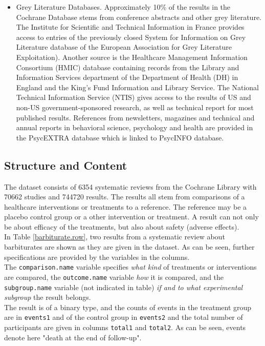 \documentclass[11pt,a4paper,twoside]{book}\usepackage[]{graphicx}\usepackage[]{color}
\begin{document}
\begin{itemize}
\item Grey Literature Databases. Approximately 10\% of the results in the Cochrane Database stems from conference abstracts and other grey literature. The Institute for Scientific and Technical Information in France provides access to entries of the previously closed System for Information on Grey Literature database of the European Association for Grey Literature Exploitation). Another source is the Healthcare Management Information Consortium (HMIC) database containing records from the Library and Information Services department of the Department of Health (DH) in England and the King's Fund Information and Library Service. The National Technical Information Service (NTIS) gives access to the results of US and non-US government-sponsored research, as well as technical report for most published results. References from newsletters, magazines and technical and annual reports in behavioral science, psychology and health are provided in the PsycEXTRA database which is linked to PsycINFO database.
\end{itemize}


\subsection{Structure and Content}
The dataset consists of 6354 systematic reviews from the Cochrane Library with 70662 studies and 744720 results. The results all stem from comparisons of a healthcare interventions or treatments to a reference. The reference may be a placebo control group or a other intervention or treatment. A result can not only be about efficacy of the treatments, but also about safety (adverse effects).\\
In Table \ref{barbiturate.row}, two results from a systematic review about barbiturates are shown as they are given in the dataset. As can be seen, further specifications are provided by the variables in the columns. \\
The \texttt{comparison.name} variable specifies \textit{what kind} of treatments or interventions are compared, the \texttt{outcome.name} variable \textit{how} it is compared, and the \texttt{subgroup.name} variable (not indicated in table) \textit{if and to what experimental subgroup} the result belongs. \\
The result is of a binary type, and the counts of events in the treatment group are in \texttt{events1} and of the control group in \texttt{events2} and the total number of participants are given in columns \texttt{total1} and \texttt{total2}. As can be seen, events denote here "death at the end of follow-up".
\end{document}
